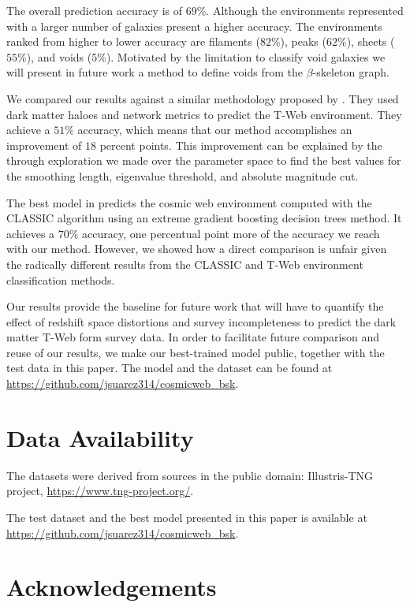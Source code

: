 \documentclass[usenatbib]{mnras}
\begin{document}
The overall prediction accuracy is of $69\%$. Although the environments represented with a larger number of galaxies present a higher accuracy. The environments ranked from higher to lower accuracy are filaments ($82\%$), peaks ($62\%$), sheets ($55\%$), and voids ($5\%$).  Motivated by the limitation to classify void galaxies we will present in future work a method to define voids from the $\beta$-skeleton graph. 

We compared our results against a similar methodology proposed by \cite{Tsizh2019}. They used dark matter haloes and network metrics to predict the T-Web environment.  They achieve a $51\%$ accuracy, which means that our method accomplishes an improvement of $18$ percent points.
This improvement can be explained by the through exploration we made over the parameter space to find the best values for
the smoothing length, eigenvalue threshold, and absolute magnitude cut.

The best model in \cite{Tsizh2019} predicts the cosmic web environment computed with the CLASSIC algorithm using an extreme gradient boosting decision trees method. 
It achieves a $70\%$ accuracy, one percentual point more of the accuracy we reach with our method. 
However, we showed how a direct comparison is unfair given the radically different results from the CLASSIC and T-Web environment classification methods.

Our results provide the baseline for future work that will have to quantify the effect of redshift space distortions and survey incompleteness to predict the dark matter T-Web form survey data.
In order to facilitate future comparison and reuse of our results, we make our best-trained model public, together with the test data in this paper.
The model and the dataset can be found at \url{https://github.com/jsuarez314/cosmicweb_bsk}.

\section*{Data Availability}

The datasets were derived from sources in the public domain: Illustris-TNG project, \url{https://www.tng-project.org/}.

The test dataset and the best model presented in this paper is available at \url{https://github.com/jsuarez314/cosmicweb_bsk}.

\section*{Acknowledgements}
\end{document}
